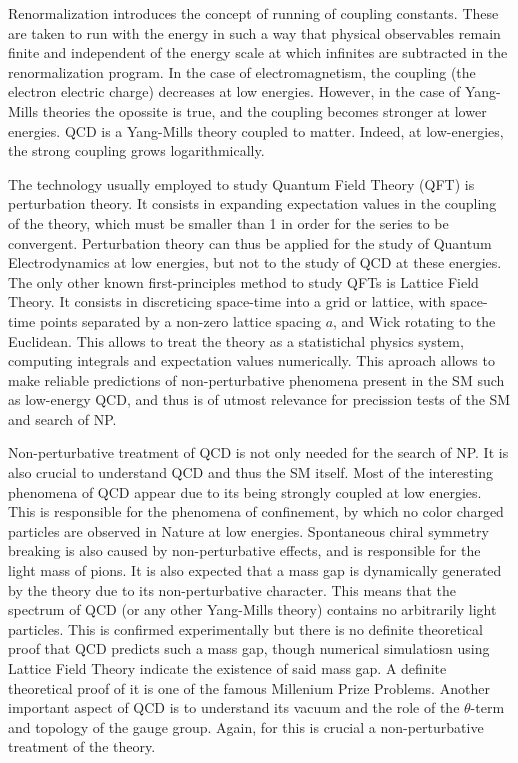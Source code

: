 Renormalization introduces the concept of running of coupling constants. These are taken to run with the energy in such a way that physical observables remain finite and independent of the energy scale at which infinites are subtracted in the renormalization program.  In the case of electromagnetism, the coupling (the electron electric charge) decreases at low energies. However, in the case of Yang-Mills theories the opossite is true, and the coupling becomes stronger at lower energies. QCD is a Yang-Mills theory coupled to matter. Indeed, at low-energies, the strong coupling grows logarithmically. 

The technology usually employed to study Quantum Field Theory (QFT) is perturbation theory. It consists in expanding expectation values in the coupling of the theory, which must be smaller than 1 in order for the series to be convergent. Perturbation theory can thus be applied for the study of Quantum Electrodynamics at low energies, but not to the study of QCD at these energies. The only other known first-principles method to study QFTs is Lattice Field Theory. It consists in discreticing space-time into a grid or lattice, with space-time points separated by a non-zero lattice spacing $a$, and Wick rotating to the Euclidean. This allows to treat the theory as a statistichal physics system, computing integrals and expectation values numerically. This aproach allows to make reliable predictions of non-perturbative phenomena present in the SM such as low-energy QCD, and thus is of utmost relevance for precission tests of the SM and search of NP. 

Non-perturbative treatment of QCD is not only needed for the search of NP. It is also crucial to understand QCD and thus the SM itself. Most of the interesting phenomena of QCD appear due to its being strongly coupled at low energies. This is responsible for the phenomena of confinement, by which no color charged particles are observed in Nature at low energies. Spontaneous chiral symmetry breaking is also caused by non-perturbative effects, and is responsible for the light mass of pions. It is also expected that a mass gap is dynamically generated by the theory due to its non-perturbative character. This means that the spectrum of QCD (or any other Yang-Mills theory) contains no arbitrarily light particles. This is confirmed experimentally but there is no definite theoretical proof that QCD predicts such a mass gap, though numerical simulatiosn using Lattice Field Theory indicate the existence of said mass gap. A definite theoretical proof of it is one of the famous Millenium Prize Problems. Another important aspect of QCD is to understand its vacuum and the role of the $\theta$-term and topology of the gauge group. Again, for this is crucial a non-perturbative treatment of the theory.

